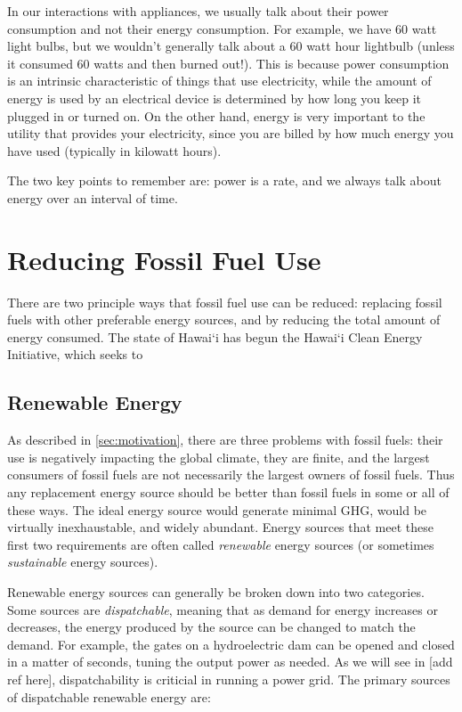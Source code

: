 In our interactions with appliances, we usually talk about their power consumption and not their energy consumption. For example, we have 60 watt light bulbs, but we wouldn't generally talk about a 60 watt hour lightbulb (unless it consumed 60 watts and then burned out!). This is because power consumption is an intrinsic characteristic of things that use electricity, while the amount of energy is used by an electrical device is determined by how long you keep it plugged in or turned on. On the other hand, energy is very important to the utility that provides your electricity, since you are billed by how much energy you have used (typically in kilowatt hours).

The two key points to remember are: power is a rate, and we always talk about energy over an interval of time.

\section{Reducing Fossil Fuel Use}

There are two principle ways that fossil fuel use can be reduced: replacing fossil fuels with other preferable energy sources, and by reducing the total amount of energy consumed. The state of Hawai`i has begun the Hawai`i Clean Energy Initiative, which seeks to 

\subsection{Renewable Energy}

As described in \autoref{sec:motivation}, there are three problems with fossil fuels: their use is negatively impacting the global climate, they are finite, and the largest consumers of fossil fuels are not necessarily the largest owners of fossil fuels. Thus any replacement energy source should be better than fossil fuels in some or all of these ways. The ideal energy source would generate minimal GHG, would be virtually inexhaustable, and widely abundant. Energy sources that meet these first two requirements are often called \emph{renewable} energy sources (or sometimes \emph{sustainable} energy sources).

Renewable energy sources can generally be broken down into two categories. Some sources are \emph{dispatchable}, meaning that as demand for energy increases or decreases, the energy produced by the source can be changed to match the demand. For example, the gates on a hydroelectric dam can be opened and closed in a matter of seconds, tuning the output power as needed. As we will see in [add ref here], dispatchability is criticial in running a power grid. The primary sources of dispatchable renewable energy are:

